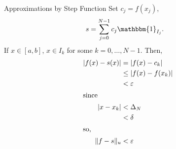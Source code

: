 \documentclass[10pt]{extarticle}
\begin{document}
\begin{problem}{Approximations by Step Function}
    Set $c_j = f(x_j)$,
    \begin{align*}
      s &= \sum_{j=0}^{N-1}c_j\mathbbm{1}_{I_j}.
    \end{align*}
    If $x\in [a,b]$, $x\in I_k$ for some $k = 0,\dots,N-1$. Then,
    \begin{align*}
      |f(x) - s(x)| &= |f(x) - c_k|\\
                    &\leq |f(x) - f(x_k)|\\
                    &< \varepsilon\\
                    \shortintertext{since}
      |x-x_k| &< \Delta_N\\
              &< \delta\\
              \shortintertext{so,}
      \Vert f - s\Vert_u &< \varepsilon
    \end{align*}
  \end{problem}
\end{document}
